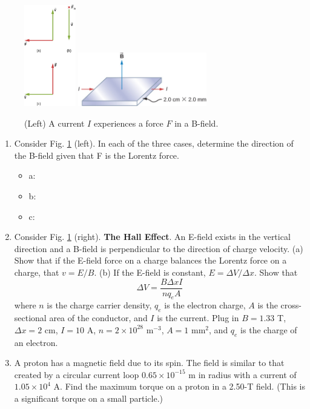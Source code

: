 \documentclass[10pt]{article}
\begin{document}
\begin{figure}
\centering
\includegraphics[width=0.2\textwidth]{bfield1.jpeg} \hspace{0.5cm}
\includegraphics[width=0.5\textwidth]{hallEffect1.jpeg}
\caption{\label{fig:chap11_1} (Left) A current $I$ experiences a force $F$ in a B-field.}
\end{figure}

\begin{enumerate}
\item Consider Fig. \ref{fig:chap11_1} (left).  In each of the three cases, determine the direction of the B-field given that F is the Lorentz force.
\begin{itemize}
\item a:
\item b:
\item c:
\end{itemize}
\item Consider Fig. \ref{fig:chap11_1} (right).  \textbf{The Hall Effect}.  An E-field exists in the vertical direction and a B-field is perpendicular to the direction of charge velocity.  (a) Show that if the E-field force on a charge balances the Lorentz force on a charge, that $v = E/B$. (b) If the E-field is constant, $E = \Delta V/\Delta x$.  Show that
\begin{equation}
\Delta V = \frac{B\Delta x I}{n q_e A}
\end{equation}
where $n$ is the charge carrier density, $q_e$ is the electron charge, $A$ is the cross-sectional area of the conductor, and $I$ is the current.  Plug in $B = 1.33$ T, $\Delta x = 2$ cm, $I = 10$ A, $n = 2 \times 10^{28}$ m$^{-3}$, $A = 1$ mm$^2$, and $q_e$ is the charge of an electron. \\ \vspace{2.5cm}
\item A proton has a magnetic field due to its spin. The field is similar to that created by a circular current loop $0.65 \times 10^{-15}$ m in radius with a current of $1.05 \times 10^{4}$ A.  Find the maximum torque on a proton in a 2.50-T field. (This is a significant torque on a small particle.) \\ \vspace{1cm}
\end{enumerate}
\end{document}
